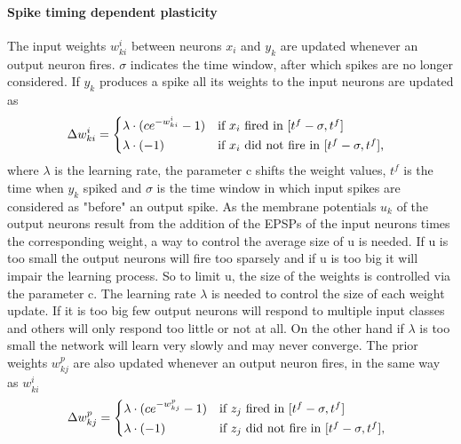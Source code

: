 \paragraph{Spike timing dependent plasticity}
The input weights $w^{i}_{ki}$ between neurons $x_i$ and $y_k$ are updated whenever an output neuron fires. $\sigma$ indicates the time window, after which spikes are no longer considered. If $y_k$ produces a spike all its weights to the input neurons are updated as
\begin{equation}
\label{deltawki}
\Delta w^{i}_{ki} = \begin{dcases*} \lambda \cdot (ce^{-w^{i}_{ki}} - 1) & if $x_{i}$ fired in $ [t^f - \sigma, t^f] $ \\
\lambda \cdot (-1) & \text{if $ x_i $ did not fire in $ [t^f - \sigma, t^f] $, } \end{dcases*}
\end{equation}
where $\lambda$ is the learning rate, the parameter c shifts the weight values, $t^f$ is the time when $y_k$ spiked and $\sigma$ is the time window in which input spikes are considered as "before" an output spike. As the membrane potentials $u_k$ of the output neurons result from the addition of the EPSPs of the input neurons times the corresponding weight, a way to control the average size of u is needed. If u is too small the output neurons will fire too sparsely and if u is too big it will impair the learning process. So to limit u, the size of the weights is controlled via the parameter c. The learning rate $\lambda$ is needed to control the size of each weight update. If it is too big few output neurons will respond to multiple input classes and others will only respond too little or not at all. On the other hand if $\lambda$ is too small the network will learn very slowly and may never converge.
The prior weights $w^{p}_{kj}$ are also updated whenever an output neuron fires, in the same way as $w^{i}_{ki}$
\begin{equation}
\label{deltawki}
\Delta w^{p}_{kj} = \begin{dcases*} \lambda \cdot (ce^{-w^{p}_{kj}} - 1) & if $z_{j}$ fired in $ [t^f - \sigma, t^f] $ \\
\lambda \cdot (-1) & \text{if $ z_j $ did not fire in $ [t^f - \sigma, t^f] $, } \end{dcases*}
\end{equation}

